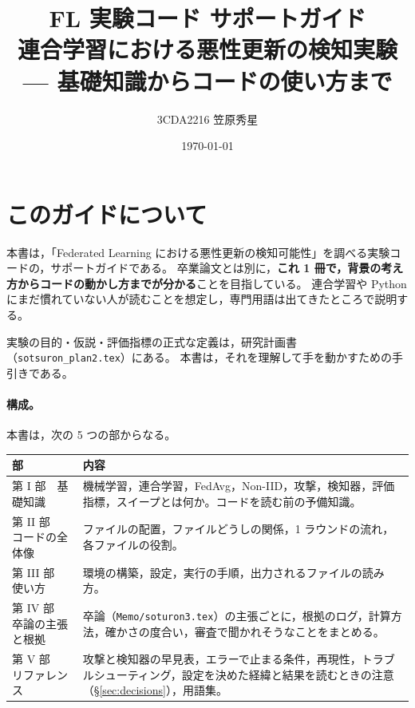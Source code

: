 \documentclass[a4j, dvipdfmx]{jsarticle}  %
\title{FL 実験コード サポートガイド\\
\large 連合学習における悪性更新の検知実験 --- 基礎知識からコードの使い方まで}
\author{3CDA2216 笠原秀星}
\date{\today}
\begin{document}
\maketitle
\tableofcontents
\clearpage

\section{このガイドについて}

本書は，「Federated Learning における悪性更新の検知可能性」を調べる実験コードの，サポートガイドである。
卒業論文とは別に，\textbf{これ 1 冊で，背景の考え方からコードの動かし方までが分かる}ことを目指している。
連合学習や Python にまだ慣れていない人が読むことを想定し，専門用語は出てきたところで説明する。

実験の目的・仮説・評価指標の正式な定義は，研究計画書（\texttt{sotsuron\_plan2.tex}）にある。
本書は，それを理解して手を動かすための手引きである。

\paragraph{構成。}
本書は，次の 5 つの部からなる。
\begin{table}[H]
\centering
\begin{tabular}{@{}P{4.6cm} P{10.7cm}@{}}
\toprule
部 & 内容 \\
\midrule
第 I 部　基礎知識 & 機械学習，連合学習，FedAvg，Non-IID，攻撃，検知器，評価指標，スイープとは何か。コードを読む前の予備知識。 \\
第 II 部　コードの全体像 & ファイルの配置，ファイルどうしの関係，1 ラウンドの流れ，各ファイルの役割。 \\
第 III 部　使い方 & 環境の構築，設定，実行の手順，出力されるファイルの読み方。 \\
第 IV 部　卒論の主張と根拠 & 卒論（\texttt{Memo/soturon3.tex}）の主張ごとに，根拠のログ，計算方法，確かさの度合い，審査で聞かれそうなことをまとめる。 \\
第 V 部　リファレンス & 攻撃と検知器の早見表，エラーで止まる条件，再現性，トラブルシューティング，設定を決めた経緯と結果を読むときの注意（\S\ref{sec:decisions}），用語集。 \\
\bottomrule
\end{tabular}
\end{table}
\end{document}
